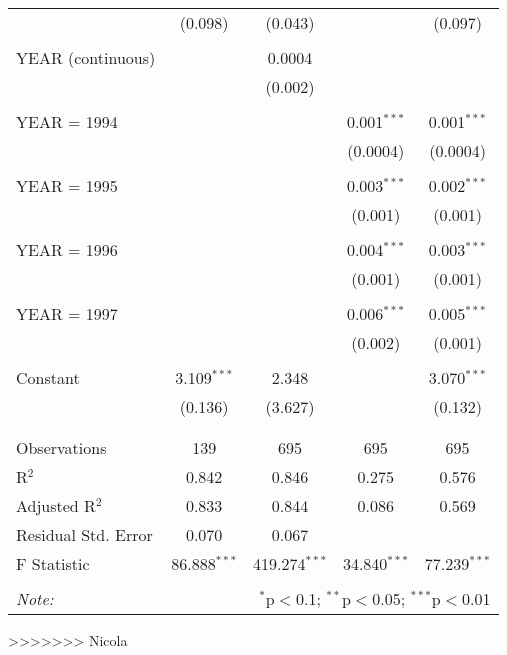 \documentclass[12pt,a4paper]{article}\usepackage[]{graphicx}\usepackage[]{color}
\begin{document}
\begin{table}[!htbp]
\begin{tabular}{@{\extracolsep{5pt}}lcccc}
  & (0.098) & (0.043) &  & (0.097) \\ 
  & & & & \\ 
 YEAR (continuous) &  & 0.0004 &  &  \\ 
  &  & (0.002) &  &  \\ 
  & & & & \\ 
 YEAR = 1994 &  &  & 0.001$^{***}$ & 0.001$^{***}$ \\ 
  &  &  & (0.0004) & (0.0004) \\ 
  & & & & \\ 
 YEAR = 1995 &  &  & 0.003$^{***}$ & 0.002$^{***}$ \\ 
  &  &  & (0.001) & (0.001) \\ 
  & & & & \\ 
 YEAR = 1996 &  &  & 0.004$^{***}$ & 0.003$^{***}$ \\ 
  &  &  & (0.001) & (0.001) \\ 
  & & & & \\ 
 YEAR = 1997 &  &  & 0.006$^{***}$ & 0.005$^{***}$ \\ 
  &  &  & (0.002) & (0.001) \\ 
  & & & & \\ 
 Constant & 3.109$^{***}$ & 2.348 &  & 3.070$^{***}$ \\ 
  & (0.136) & (3.627) &  & (0.132) \\ 
  & & & & \\ 
\hline \\[-1.8ex] 
Observations & 139 & 695 & 695 & 695 \\ 
R$^{2}$ & 0.842 & 0.846 & 0.275 & 0.576 \\ 
Adjusted R$^{2}$ & 0.833 & 0.844 & 0.086 & 0.569 \\ 
Residual Std. Error & 0.070 & 0.067 &  &  \\ 
F Statistic & 86.888$^{***}$ & 419.274$^{***}$ & 34.840$^{***}$ & 77.239$^{***}$ \\ 
\hline 
\hline \\[-1.8ex] 
\textit{Note:}  & \multicolumn{4}{r}{$^{*}$p$<$0.1; $^{**}$p$<$0.05; $^{***}$p$<$0.01} \\ 
\end{tabular} 
\end{table} 
>>>>>>> Nicola
\end{document}
